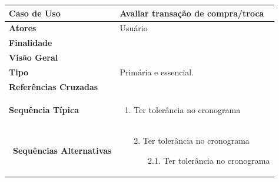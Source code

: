 \documentclass[a4paper,11pt]{article}
\begin{document}
\begin{table}[H]
		\begin{tabularx}{\textwidth}{|l|X|}
		\hline
			\textbf{Caso de Uso} &  Avaliar transação de compra/troca \\ \hline
			\textbf{Atores} &  Usuário  \\ \hline
			\textbf{Finalidade} &   \\ \hline
			\textbf{Visão Geral} &  \\ \hline
			\textbf{Tipo} &  Primária e essencial. \\ \hline
			\textbf{Referências Cruzadas} &  \\ \hline
			\textbf{Sequência Típica} & 
			\begin{enumerate}
			\item Ter tolerância no cronograma
			\end{enumerate} \\ \hline
			\
			\textbf{Sequências Alternativas} & 
			\begin{itemize}
				\item[2.] Ter tolerância no cronograma
				\begin{itemize}
					\item[2.1.] Ter tolerância no cronograma
				\end{itemize}
			\end{itemize} \\ \hline
		\end{tabularx}
\end{table}
\end{document}
